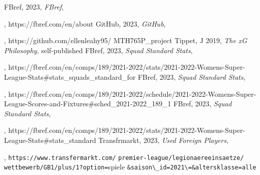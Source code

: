 \documentclass[12pt, a4paper, twocolumn]{article}
\begin{document}
\begin{thebibliography}{10}
 FBref, 2023, \textit{FBref}, \date{January 7, 2023}, \textlangle https://fbref.com/en/about \textrangle
{} GitHub, 2023, \textit{GitHub}, \date{January 16 2023}, \textlangle https://github.com/ellenleahy95/
MTH765P\_project \textrangle
{} Tippet, J 2019, \textit{The xG Philosophy}, self-published
 FBref, 2023, \textit{Squad Standard Stats}, \date{December 11, 2022}, \textlangle  https://fbref.com/en/comps/189/2021-2022/stats/2021-2022-Womens-Super-League-Stats\#stats\_squads\_standard\_for \textrangle
{} FBref, 2023, \textit{Squad Standard Stats}, \date{December 11, 2022}, \textlangle  https://fbref.com/en/comps/189/2021-2022/schedule/2021-2022-Womens-Super-League-Scores-and-Fixtures\#sched\_2021-2022\_189\_1 \textrangle
{} FBref, 2023, \textit{Squad Standard Stats}, \date{December 11, 2022}, \textlangle  https://fbref.com/en/comps/189/2021-2022/stats/2021-2022-Womens-Super-League-Stats\#stats\_standard \textrangle
{} Transfrmarkt, 2023, \textit{Used Foreign Players}, \date{January 11, 2023}, \textlangle   \verb|https://www.transfermarkt.com/| \verb|premier-league/legionaereeinsaetze/| \verb|wettbewerb/GB1/plus/1?option=|spiele \verb|&saison\_id=2021\=&altersklasse=alle| \textrangle
\end{thebibliography}
\end{document}
